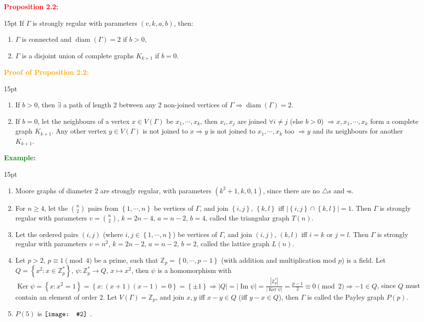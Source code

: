 \documentclass[12pt]{article}
\newcommand{\noparskip}{\vspace{-\parskip}}
\newenvironment{points}
	{\begin{enumerate}[label = (\arabic*)]}
	{\end{enumerate}}
\newenvironment{dent}
	{\begin{adjustwidth}{15pt}{}\noparskip}
	{\end{adjustwidth}}
\newenvironment{result}[1]
	{\textcolor{Red}{\textbf{#1:}}\begin{dent}}
	{\end{dent}}
\newenvironment{proof}[1]
	{\textcolor{Orange}{\textbf{Proof of #1:}}\begin{dent}}
	{\end{dent}}
\newenvironment{example}
	{\textcolor{Green}{\textbf{Example:}}\begin{dent}}
	{\end{dent}}
\newcommand{\pic}[2][1.0]{
	$\vcenter{\hbox{\texttt{[image: \#2]}\ }}$}
\renewcommand{\implies}{\Rightarrow}
\newcommand{\set}[1]{\left\{ #1 \right\}}
\newcommand{\sizeof}[1]{\left| #1 \right|}
\newcommand{\Z}{\mathbb{Z}}
\newcommand{\diam}[1]{\operatorname{diam}(#1)}
\renewcommand{\ker}{\operatorname{Ker}}
\newcommand{\img}{\operatorname{Im}}
\begin{document}
\begin{result}{Proposition 2.2}
If $\Gamma$ is strongly regular with parameters $(v, k, a, b)$, then:
\noparskip
\begin{points}
\item $\Gamma$ is connected and $\diam{\Gamma} = 2$ if $b > 0$,
\item $\Gamma$ is a disjoint union of complete graphs $K_{k + 1}$ if $b = 0$.
\end{points}
\end{result}

\begin{proof}{Proposition 2.2}
\begin{points}
\item If $b > 0$, then $\exists$ a path of length 2 between any 2 non-joined vertices of $\Gamma \implies \diam{\Gamma} = 2$.
\item If $b = 0$, let the neighbours of a vertex $x \in V(\Gamma)$ be $x_1, \cdots, x_k$, then $x_i, x_j$ are joined $\forall i \ne j$ (else $b > 0$) $\implies x, x_1, \cdots, x_k$ form a complete graph $K_{k + 1}$. Any other vertex $y \in V(\Gamma)$ is not joined to $x \implies y$ is not joined to $x_1, \cdots, x_k$ too $\implies y$ and its neighbours for another $K_{k + 1}$.
\end{points}
\end{proof}

\begin{example}
\begin{points}
\item Moore graphs of diameter 2 are strongly regular, with parameters $(k^2 + 1, k, 0, 1)$, since there are no $\triangle$s and $\square$s.
\item For $n \ge 4$, let the $\binom{n}{2}$ pairs from $\set{1, \cdots, n}$ be vertices of $\Gamma$, and join $\set{i, j}$, $\set{k, l}$ iff $\sizeof{\set{i, j} \cap \set{k, l}} = 1$. Then $\Gamma$ is strongly regular with parameters $v = \binom{n}{2}$, $k = 2n - 4$, $a = n - 2$, $b = 4$, called the triangular graph $T(n)$.
\item Let the ordered pairs $(i, j)$ (where $i, j \in \set{1, \cdots, n}$) be vertices of $\Gamma$, and join $(i, j)$, $(k, l)$ iff $i = k$ or $j = l$. Then $\Gamma$ is strongly regular with parameters $v = n^2$, $k = 2n - 2$, $a = n - 2$, $b = 2$, called the lattice graph $L(n)$.
\item Let $p > 2$, $p \equiv 1 \pmod{4}$ be a prime, such that $\Z_p = \set{0, \cdots, p - 1}$ (with addition and multiplication mod $p$) is a field. Let $Q = \set{x^2: x \in \Z_p^*}$, $\psi: \Z_p^* \rightarrow Q$, $x \mapsto x^2$, then $\psi$ is a homomorphism with $\ker \psi = \set{x: x^2 = 1} = \set{x: (x + 1)(x - 1) = 0} = \set{\pm 1} \implies \sizeof{Q} = \sizeof{\img \psi} = \frac{\sizeof{\Z_p^*}}{\sizeof{\ker \psi}} = \frac{p - 1}{2} \equiv 0 \pmod{2} \implies -1 \in Q$, since $Q$ must contain an element of order 2. Let $V(\Gamma) = \Z_p$, and join $x, y$ iff $x - y \in Q$ (iff $y - x \in Q$), then $\Gamma$ is called the Payley graph $P(p)$.
\item $P(5)$ is \pic[0.3]{10.png}.
\end{points}
\end{example}
\end{document}
